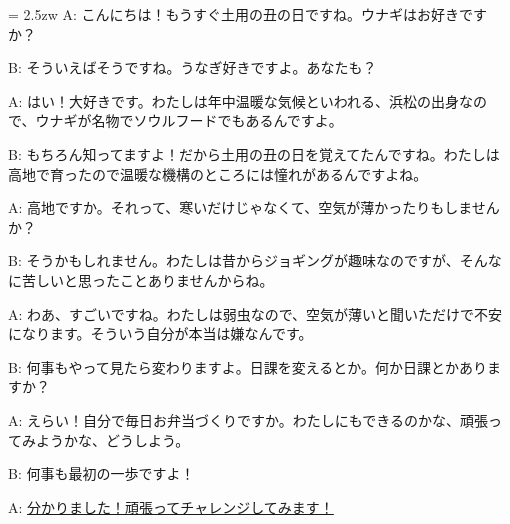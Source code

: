 \documentclass[11pt]{amsart}
\title{}
\author{}
\newenvironment{hangall}[1]{\hangindent = 2.5zw\everypar{\hangindent = 2.5zw}}{}
\begin{document}
\maketitle
\begin{hangall}{}%
A: こんにちは！もうすぐ土用の丑の日ですね。ウナギはお好きですか？

B: そういえばそうですね。うなぎ好きですよ。あなたも？

A: はい！大好きです。わたしは年中温暖な気候といわれる、浜松の出身なので、ウナギが名物でソウルフードでもあるんですよ。

B: もちろん知ってますよ！だから土用の丑の日を覚えてたんですね。わたしは高地で育ったので温暖な機構のところには憧れがあるんですよね。

A: 高地ですか。それって、寒いだけじゃなくて、空気が薄かったりもしませんか？

B: そうかもしれません。わたしは昔からジョギングが趣味なのですが、そんなに苦しいと思ったことありませんからね。

A: わあ、すごいですね。わたしは弱虫なので、空気が薄いと聞いただけで不安になります。そういう自分が本当は嫌なんです。

B: 何事もやって見たら変わりますよ。日課を変えるとか。何か日課とかありますか？

A: えらい！自分で毎日お弁当づくりですか。わたしにもできるのかな、頑張ってみようかな、どうしよう。

B: 何事も最初の一歩ですよ！

A: \ul{分かりました！頑張ってチャレンジしてみます！}\end{hangall}
\end{document}
